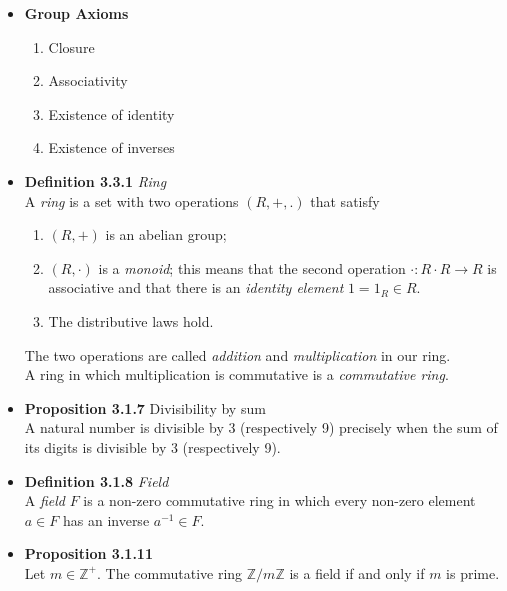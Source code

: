 \documentclass[11pt,a4paper]{article}
\begin{document}
\begin{itemize}

    \item \textbf{Group Axioms}
        \begin{enumerate}
            \item Closure
            \item Associativity
            \item Existence of identity
            \item Existence of inverses
        \end{enumerate}

    \item \textbf{Definition 3.3.1} \emph{Ring} \\
        A \emph{ring} is a set with two operations $(R,+,.)$ that satisfy
        \begin{enumerate}
            \item $(R,+)$ is an abelian group;
            \item $(R, \cdot)$ is a \emph{monoid}; this means that the second operation
                $\cdot : R \cdot R \to R$ is associative and that there is an
                \emph{identity element} $1=1_R \in R$.
            \item The distributive laws hold.
        \end{enumerate}
        The two operations are called \emph{addition} and \emph{multiplication} in our ring. \\
        A ring in which multiplication is commutative is a \emph{commutative ring}. \\

    \item \textbf{Proposition 3.1.7} Divisibility by sum \\
        A natural number is divisible by 3 (respectively 9) precisely when the sum of its digits is
        divisible by 3 (respectively 9).

    \item \textbf{Definition 3.1.8} \emph{Field} \\
        A \emph{field} $F$ is a non-zero commutative ring in which every non-zero element
        $a \in F$ has an inverse $a^{-1} \in F$.

    \item \textbf{Proposition 3.1.11} \\
        Let $m \in \mathbb{Z}^+$.
        The commutative ring $\mathbb{Z} / m\mathbb{Z}$ is a field if and only if $m$ is prime.
\end{itemize}
\end{document}
